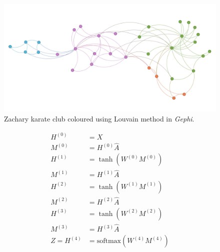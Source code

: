 \documentclass[mathserif,10pt]{beamer}
\begin{document}
\begin{frame}
  \begin{figure}
    \includegraphics[scale=0.09]{figs/zachary.jpg}
    \caption{Zachary karate club coloured using Louvain method in \emph{Gephi}.}
  \end{figure}
\end{frame}

\begin{frame}
  \begin{subequations}
    \begin{align}
      H^{(0)} &= X \\
      M^{(0)} &= H^{(0)}\hat{A} \\
      H^{(1)} &= \tanh \left(W^{(0)} M^{(0)}\right) \\
      M^{(1)} &= H^{(1)}\hat{A} \\
      H^{(2)} &= \tanh \left(W^{(1)} M^{(1)}\right) \\
      M^{(2)} &= H^{(2)}\hat{A} \\
      H^{(3)} &= \tanh \left(W^{(2)} M^{(2)}\right) \\
      M^{(3)} &= H^{(3)}\hat{A} \\
  Z = H^{(4)} &= \text{softmax}\left(W^{(4)} M^{(4)}\right)
    \end{align}
  \end{subequations} 
\end{frame}
\end{document}
